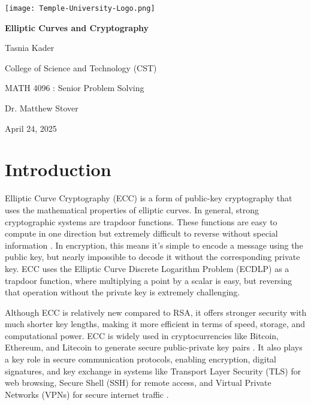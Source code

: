 \documentclass[11pt]{article}
\begin{document}
\begin{titlepage}
\centering

\texttt{[image: Temple-University-Logo.png]}
\vspace{2cm}

\vspace*{\fill}
{\Huge\bfseries Elliptic Curves and Cryptography \par}
\vspace{0.5cm}
{\Huge Tasnia Kader \par}
\vspace*{\fill}

\vfill
\vspace{2cm}

{\LARGE College of Science and Technology (CST) \par}
\vspace{0.5cm}
{\LARGE MATH 4096 : Senior Problem Solving \par}
\vspace{0.5cm}
{\LARGE Dr. Matthew Stover \par}
\vspace{0.5cm}
{\LARGE April 24, 2025 \par}

\end{titlepage}




\section{Introduction}
Elliptic Curve Cryptography (ECC) is a form of public-key cryptography that uses the mathematical properties of elliptic curves. In general, strong cryptographic systems are trapdoor functions. These functions are easy to compute in one direction but extremely difficult to reverse without special information \cite{rothaar}. In encryption, this means it's simple to
encode a message using the public key, but nearly impossible to decode it without the corresponding private key. ECC uses the Elliptic Curve Discrete Logarithm Problem (ECDLP) as a trapdoor function, where multiplying a point by a scalar is easy, but reversing that operation without the private key is extremely challenging.

\vspace{0.3cm}

Although ECC is relatively new compared to RSA, it offers stronger security with much shorter key lengths, making it more efficient in terms of speed, storage, and computational power. ECC is widely used in cryptocurrencies like Bitcoin, Ethereum, and Litecoin to generate secure public-private key pairs \cite{rothaar}. It also plays a key role in secure
communication protocols, enabling encryption, digital signatures, and key exchange in systems like Transport Layer Security (TLS) for web browsing, Secure Shell (SSH) for remote access, and Virtual Private Networks (VPNs) for secure internet traffic \cite{rothaar}.
\end{document}

